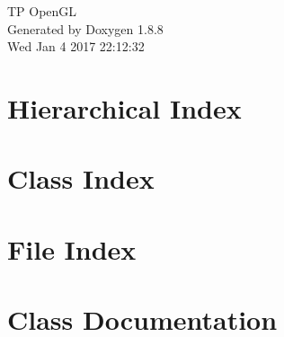\documentclass[twoside]{book}
\newcommand{\+}{\discretionary{\mbox{\scriptsize$\hookleftarrow$}}{}{}}
\newcommand{\clearemptydoublepage}{%
  \newpage{\pagestyle{empty}\cleardoublepage}%
}
\begin{document}
\hypersetup{pageanchor=false,
             bookmarks=true,
             bookmarksnumbered=true,
             pdfencoding=unicode
            }
\begin{titlepage}
\vspace*{7cm}
\begin{center}%
{\Large T\+P Open\+G\+L }\\
\vspace*{1cm}
{\large Generated by Doxygen 1.8.8}\\
\vspace*{0.5cm}
{\small Wed Jan 4 2017 22:12:32}\\
\end{center}
\end{titlepage}
\clearemptydoublepage
\tableofcontents
\clearemptydoublepage
{}
\hypersetup{pageanchor=true}

\chapter{Hierarchical Index}

\chapter{Class Index}

\chapter{File Index}

\chapter{Class Documentation}



























\end{document}

